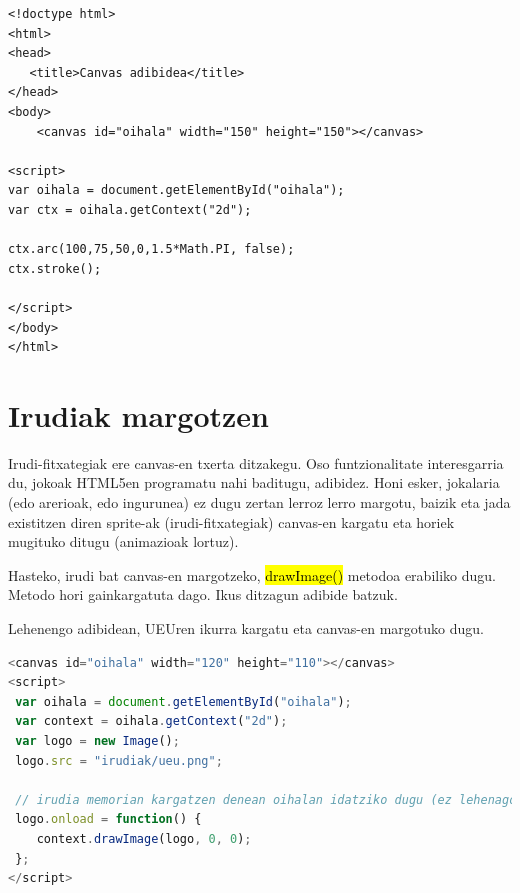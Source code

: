 \begin{lstlisting}[language=HTML5, caption={Arku bat margotzeko kodea. Hemen eskuragarri: \href{https://codesandbox.io/s/canvas-arkua-75d7q}{https://codesandbox.io/s/canvas-arkua-75d7q}.}, label={lst:arkua}]
<!doctype html>
<html>
<head>
   <title>Canvas adibidea</title>
</head>
<body>
    <canvas id="oihala" width="150" height="150"></canvas>

<script>
var oihala = document.getElementById("oihala");
var ctx = oihala.getContext("2d");

ctx.arc(100,75,50,0,1.5*Math.PI, false);
ctx.stroke();

</script>
</body>
</html>
\end{lstlisting}

 
\section{Irudiak margotzen}
Irudi-fitxategiak ere canvas-en txerta ditzakegu. Oso funtzionalitate interesgarria du, jokoak HTML5en programatu nahi baditugu, adibidez. Honi esker, jokalaria (edo arerioak, edo ingurunea) ez dugu zertan lerroz lerro margotu, baizik eta jada existitzen diren sprite-ak (irudi-fitxategiak) canvas-en kargatu eta horiek mugituko ditugu (animazioak lortuz).

Hasteko, irudi bat canvas-en margotzeko, \hl{drawImage()} metodoa erabiliko dugu. Metodo hori gainkargatuta dago. Ikus ditzagun adibide batzuk.

Lehenengo adibidean, UEUren ikurra kargatu eta canvas-en margotuko dugu.

\begin{lstlisting}[language=JavaScript, caption={UEUren logoa canvas-en margotuko dugu. Kodea hemen eskuragarri: \href{https://codesandbox.io/s/canvas-irudia-kk55q}{https://codesandbox.io/s/canvas-irudia-kk55q}.}, label={lst:canvas-ueu}]
<canvas id="oihala" width="120" height="110"></canvas>
<script>
 var oihala = document.getElementById("oihala");
 var context = oihala.getContext("2d");
 var logo = new Image();
 logo.src = "irudiak/ueu.png";
 
 // irudia memorian kargatzen denean oihalan idatziko dugu (ez lehenago)
 logo.onload = function() {
    context.drawImage(logo, 0, 0);
 };
</script>
\end{lstlisting}


